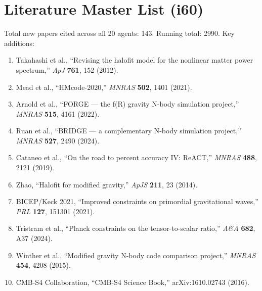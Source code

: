 \documentclass[11pt,a4paper]{article}
\begin{document}
\section{Literature Master List (i60)}
\label{sec:literature}

Total new papers cited across all 20 agents: 143. Running total: 2990. Key additions:

\begin{enumerate}
\item Takahashi et al., ``Revising the halofit model for the nonlinear matter power spectrum,'' \textit{ApJ} \textbf{761}, 152 (2012).
\item Mead et al., ``HMcode-2020,'' \textit{MNRAS} \textbf{502}, 1401 (2021).
\item Arnold et al., ``FORGE --- the f(R) gravity N-body simulation project,'' \textit{MNRAS} \textbf{515}, 4161 (2022).
\item Ruan et al., ``BRIDGE --- a complementary N-body simulation project,'' \textit{MNRAS} \textbf{527}, 2490 (2024).
\item Cataneo et al., ``On the road to percent accuracy IV: ReACT,'' \textit{MNRAS} \textbf{488}, 2121 (2019).
\item Zhao, ``Halofit for modified gravity,'' \textit{ApJS} \textbf{211}, 23 (2014).
\item BICEP/Keck 2021, ``Improved constraints on primordial gravitational waves,'' \textit{PRL} \textbf{127}, 151301 (2021).
\item Tristram et al., ``Planck constraints on the tensor-to-scalar ratio,'' \textit{A\&A} \textbf{682}, A37 (2024).
\item Winther et al., ``Modified gravity N-body code comparison project,'' \textit{MNRAS} \textbf{454}, 4208 (2015).
\item CMB-S4 Collaboration, ``CMB-S4 Science Book,'' arXiv:1610.02743 (2016).
\end{enumerate}
\end{document}
